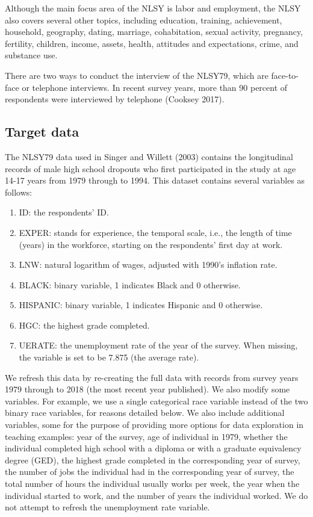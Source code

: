 \documentclass[12pt]{article}
\providecommand{\tightlist}{%
  \setlength{\itemsep}{0pt}\setlength{\parskip}{0pt}}
\begin{document}
Although the main focus area of the NLSY is labor and employment, the NLSY also covers several other topics, including education, training, achievement, household, geography, dating, marriage, cohabitation, sexual activity, pregnancy, fertility, children, income, assets, health, attitudes and expectations, crime, and substance use.

There are two ways to conduct the interview of the NLSY79, which are face-to-face or telephone interviews. In recent survey years, more than 90 percent of respondents were interviewed by telephone (Cooksey 2017).

\hypertarget{target}{%
\subsection{Target data}\label{target}}

The NLSY79 data used in Singer and Willett (2003) contains the longitudinal records of male high school dropouts who first participated in the study at age 14-17 years from 1979 through to 1994. This dataset contains several variables as follows:

\begin{enumerate}
\def\labelenumi{\arabic{enumi}.}
\tightlist
\item
  ID: the respondents' ID.
\item
  EXPER: stands for experience, the temporal scale, i.e., the length of time (years) in the workforce, starting on the respondents' first day at work.
\item
  LNW: natural logarithm of wages, adjusted with 1990's inflation rate.
\item
  BLACK: binary variable, 1 indicates Black and 0 otherwise.
\item
  HISPANIC: binary variable, 1 indicates Hispanic and 0 otherwise.
\item
  HGC: the highest grade completed.
\item
  UERATE: the unemployment rate of the year of the survey. When missing, the variable is set to be 7.875 (the average rate).
\end{enumerate}

We refresh this data by re-creating the full data with records from survey years 1979 through to 2018 (the most recent year published). We also modify some variables. For example, we use a single categorical race variable instead of the two binary race variables, for reasons detailed below. We also include additional variables, some for the purpose of providing more options for data exploration in teaching examples: year of the survey, age of individual in 1979, whether the individual completed high school with a diploma or with a graduate equivalency degree (GED), the highest grade completed in the corresponding year of survey, the number of jobs the individual had in the corresponding year of survey, the total number of hours the individual usually works per week, the year when the individual started to work, and the number of years the individual worked. We do not attempt to refresh the unemployment rate variable.
\end{document}
